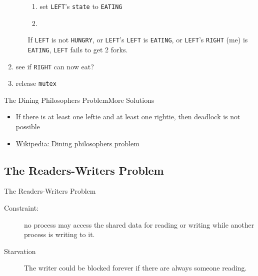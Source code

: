 \begin{enumerate}
\begin{enumerate}
    \begin{enumerate}
    \item set \texttt{LEFT}'s \texttt{state} to \texttt{EATING}
    \item {} 
    \end{enumerate}
  \item [If] \texttt{LEFT} is not \texttt{HUNGRY}, or \texttt{LEFT}'s \texttt{LEFT} is
    \texttt{EATING}, or \texttt{LEFT}'s \texttt{RIGHT} (me) is \texttt{EATING}, \texttt{LEFT} fails
    to get 2 forks.
  \end{enumerate}
\item {} see if \texttt{RIGHT} can now eat?
\item release \texttt{mutex}
\end{enumerate}

\begin{frame}{The Dining Philosophers Problem}{More Solutions}
  \begin{itemize}
  \item If there is at least one leftie and at least one rightie, then
      deadlock is not possible
  \item \href{http://en.wikipedia.org/wiki/Dining_philosophers_problem}{Wikipedia: Dining
      philosophers problem}
  \end{itemize}
\end{frame}

\subsection{The Readers-Writers Problem}

\begin{frame}{The Readers-Writers Problem}
  \begin{description}
  \item[Constraint:] no process may access the shared data for reading or writing while
    another process is writing to it.
  \end{description}
  \begin{center}
  \end{center}
  \pause
  \begin{description}
  \item[Starvation] The writer could be blocked forever if there are always someone
    reading.
  \end{description}
\end{frame}


